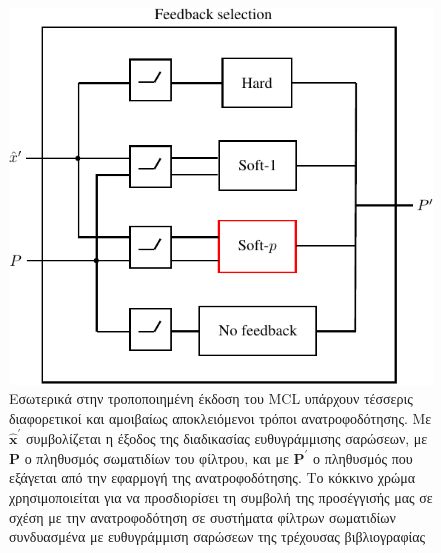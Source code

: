 \begin{figure}[ht]\centering
  \includegraphics[scale=0.9]{./figures/parts/02/chapters/02/sections/03/feedback}
  \caption{\small Εσωτερικά στην τροποποιημένη έκδοση του MCL υπάρχουν τέσσερις
           διαφορετικοί και αμοιβαίως αποκλειόμενοι τρόποι ανατροφοδότησης. Με
           $\hat{\bm{x}}^{\prime}$ συμβολίζεται η έξοδος της διαδικασίας
           ευθυγράμμισης σαρώσεων, με $\bm{P}$ ο πληθυσμός σωματιδίων του
           φίλτρου, και με $\bm{P}^{\prime}$ ο πληθυσμός που εξάγεται από την
           εφαρμογή της ανατροφοδότησης. Το κόκκινο χρώμα χρησιμοποιείται για να
           προσδιορίσει τη συμβολή της προσέγγισής μας σε σχέση με την
           ανατροφοδότηση σε συστήματα φίλτρων σωματιδίων συνδυασμένα με
           ευθυγράμμιση σαρώσεων της τρέχουσας βιβλιογραφίας}
  \label{fig:feedback}
\end{figure}


